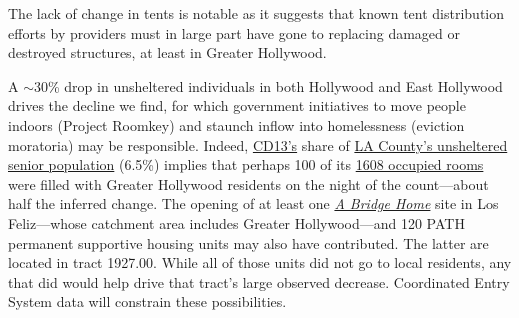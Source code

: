 \documentclass[11pt,twocolumn]{article}
\begin{document}
The lack of change in tents is notable as it suggests that known tent distribution efforts by 
providers must in large part have gone to replacing damaged or destroyed structures, at least 
in Greater Hollywood.


A $\sim$30\% drop in unsheltered individuals in both Hollywood and 
East Hollywood drives the decline we find, for which government initiatives to move people indoors 
(Project Roomkey) and staunch inflow into homelessness (eviction moratoria) may be responsible. 
Indeed, \href{https://www.lahsa.org/documents?id=4672-2020-homeless-count-council-district-13}{CD13's} share of \href{https://www.lahsa.org/documents?id=4585-2020-greater-los-angeles-homeless-count-los-angeles-continuum-of-care-coc-}{LA County's unsheltered senior population} (6.5\%) implies that perhaps 100 of its \href{https://projectroomkeytracker.com/}{1608 occupied rooms} were filled with Greater Hollywood residents on the night 
of the count---about half the inferred change. The opening of at least one 
\href{https://www.lamayor.org/ABridgeHome}{\it A Bridge Home} site in Los Feliz---whose catchment area 
includes Greater Hollywood---and 120 PATH permanent supportive housing units may also have contributed. 
The latter are located in tract 1927.00. While all of those units did not go to local residents, any that did would help
drive that tract's large observed decrease. Coordinated Entry System data will constrain these possibilities.
\end{document}
